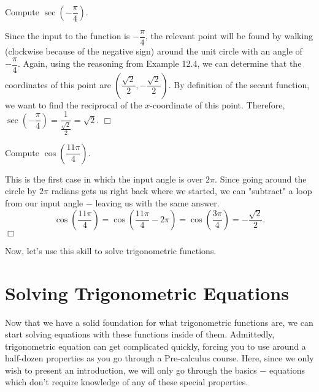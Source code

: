 \documentclass[lang=en,11pt]{elegantbook}
\begin{document}
\begin{example}
Compute $\sec\left(-\dfrac{\pi}{4}\right)$.
\end{example}
\begin{solution}
Since the input to the function is $-\dfrac{\pi}{4}$, the relevant point will be found by walking (clockwise because of the negative sign) around the unit circle with an angle of $-\dfrac{\pi}{4}$. Again, using the reasoning from Example 12.4, we can determine that the coordinates of this point are $\left(\dfrac{\sqrt{2}}{2},-\dfrac{\sqrt{2}}{2}\right)$. By definition of the secant function, we want to find the reciprocal of the $x$-coordinate of this point. Therefore, $\sec\left(-\dfrac{\pi}{4}\right)=\dfrac{1}{\frac{\sqrt{2}}{2}}=\sqrt{2}.$ $\Box$
\end{solution}
\begin{example}
Compute $\cos\left(\dfrac{11\pi}{4}\right)$.
\end{example}
\begin{solution}
This is the first case in which the input angle is over $2\pi$. Since going around the circle by $2\pi$ radians gets us right back where we started, we can "subtract" a loop from our input angle $-$ leaving us with the same answer. $$\cos\left(\dfrac{11\pi}{4}\right)=\cos\left(\dfrac{11\pi}{4}-2\pi\right)=\cos\left(\dfrac{3\pi}{4}\right)=-\dfrac{\sqrt{2}}{2}.$$ $\Box$
\end{solution}
\noindent Now, let's use this skill to solve trigonometric functions.
\section{Solving Trigonometric Equations}
\noindent Now that we have a solid foundation for what trigonometric functions are, we can start solving equations with these functions inside of them. Admittedly, trigonometric equation can get complicated quickly, forcing you to use around a half-dozen properties as you go through a Pre-calculus course. Here, since we only wish to present an introduction, we will only go through the basics $-$ equations which don’t require knowledge of any of these special properties. 
\end{document}
